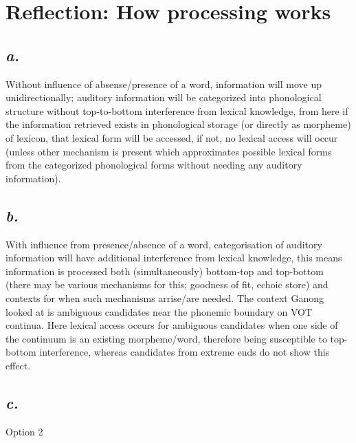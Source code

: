 \documentclass[12pt]{article}
\newcommand{\mysection}[2]{\setcounter{section}{#1}\addtocounter{section}{-1}\section{#2}}
\begin{document}

\mysection{0}{Reflection: How processing works}


\subsection*{\emph{a.}}
Without influence of absense/presence of a word, information will move up unidirectionally; auditory information will be categorized into phonological structure without top-to-bottom interference from lexical knowledge, from here if the information retrieved exists in phono\-logical storage (or directly as morpheme) of lexicon, that lexical form will be accessed, if not, no lexical access will occur (unless other mechanism is present which approximates possible lexical forms from the categorized phonological forms without needing any auditory information).

\subsection*{\emph{b.}}
With influence from presence/absence of a word, categorisation of auditory information will have additional interference from lexical knowledge, this means information is processed both (simultaneously) bottom-top and top-bottom (there may be various mechanisms for this; goodness of fit, echoic store) and contexts for when such mechanisms arrise/are needed. The context Ganong looked at is ambiguous candidates near the phonemic boundary on VOT continua. Here lexical access occurs for ambiguous candidates when one side of the continuum is an existing morpheme/word, therefore being susceptible to top-bottom interference, whereas candidates from extreme ends do not show this effect. 

\subsection*{\emph{c.}}
Option 2



\end{document}
